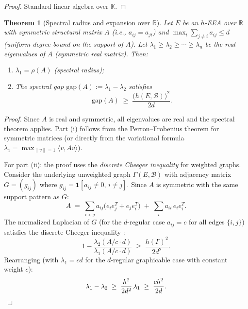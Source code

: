 \documentclass[12pt,a4paper]{amsart}
\newtheorem{theorem}{Theorem}[section]
\theoremstyle{definition}
\newcommand{\K}{\mathbb{K}}
\newcommand{\R}{\mathbb{R}}
\newcommand{\hh}{h}          %
\newcommand{\EA}{E}          %
\newcommand{\natbasis}{\mathcal{B}}  %
\newcommand{\strmat}{A}      %
\begin{document}
\begin{proof}
Standard linear algebra over $\K$.
\end{proof}

\begin{theorem}[Spectral radius and expansion over $\R$]\label{thm:spectral-radius}
Let $\EA$ be an $h$-EEA over $\R$ with symmetric structural matrix
$\strmat$ (i.e., $a_{ij}=a_{ji}$) and $\max_i \sum_{j\ne i} a_{ij}
\le d$ (uniform degree bound on the \emph{support} of $\strmat$).
Let $\lambda_1\ge\lambda_2\ge\cdots\ge\lambda_n$ be the real
eigenvalues of $\strmat$ (symmetric real matrix).  Then:
\begin{enumerate}[label=\normalfont(\roman*)]
  \item $\lambda_1=\rho(\strmat)$ (spectral radius);
  \item The \emph{spectral gap} $\mathrm{gap}(\strmat):=\lambda_1-\lambda_2$
        satisfies
        \[
          \mathrm{gap}(\strmat) \;\ge\;
          \frac{\bigl(\hh(\EA,\natbasis)\bigr)^2}{2d}.
        \]
\end{enumerate}
\end{theorem}

\begin{proof}
Since $\strmat$ is real and symmetric, all eigenvalues are real and the
spectral theorem applies.  Part (i) follows from the Perron--Frobenius
theorem for symmetric matrices (or directly from the variational formula
$\lambda_1=\max_{\|v\|=1}\langle v,\strmat v\rangle$).

For part (ii): the proof uses the \emph{discrete Cheeger inequality} for
weighted graphs.  Consider the underlying unweighted graph
$\varGamma(\EA,\natbasis)$ with adjacency matrix $G=(g_{ij})$ where
$g_{ij}=\mathbf{1}[a_{ij}\ne 0,\, i\ne j]$.  Since $\strmat$ is
symmetric with the same support pattern as $G$:
\[
  \strmat \;=\; \sum_{i<j} a_{ij}\bigl(e_i e_j^T + e_j e_i^T\bigr)
             \;+\; \sum_i a_{ii}\,e_i e_i^T.
\]
The normalized Laplacian of $G$ (for the $d$-regular case $a_{ij}=c$
for all edges $\{i,j\}$) satisfies the discrete Cheeger inequality
\cite[Chapter~3]{Kowalski2019}:
\[
  1 - \frac{\lambda_2(\strmat/c\cdot d)}{\lambda_1(\strmat/c\cdot d)}
  \;\ge\;
  \frac{\hh(\varGamma)^2}{2d^2}.
\]
Rearranging (with $\lambda_1=cd$ for the $d$-regular graphicable case
with constant weight $c$):
\[
  \lambda_1-\lambda_2
  \;\ge\;
  \frac{h^2}{2d^2}\,\lambda_1
  \;\ge\;
  \frac{c h^2}{2d}.
  \qedhere
\]
\end{proof}

\end{document}
